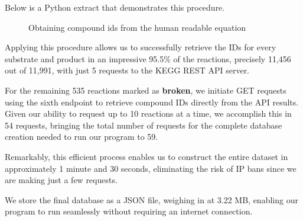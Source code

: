 Below is a Python extract that demonstrates this procedure.

\begin{figure}[H]
    \centering
    
    \caption{Obtaining compound ids from the human readable equation}
    \label{fig:compound_verbose_and_reaction_to_id}
\end{figure}

Applying this procedure allows us to successfully retrieve the IDs for every substrate and product in an impressive 95.5\% of the reactions, precisely 11,456 out of 11,991, with just 5 requests to the KEGG REST API server.

For the remaining 535 reactions marked as \textbf{broken}, we initiate GET requests using the sixth endpoint to retrieve compound IDs directly from the API results. Given our ability to request up to 10 reactions at a time, we accomplish this in 54 requests, bringing the total number of requests for the complete database creation needed to run our program to 59. 

Remarkably, this efficient process enables us to construct the entire dataset in approximately 1 minute and 30 seconds, eliminating the risk of IP bans since we are making just a few requests.

We store the final database as a JSON file, weighing in at 3.22 MB, enabling our program to run seamlessly without requiring an internet connection.
